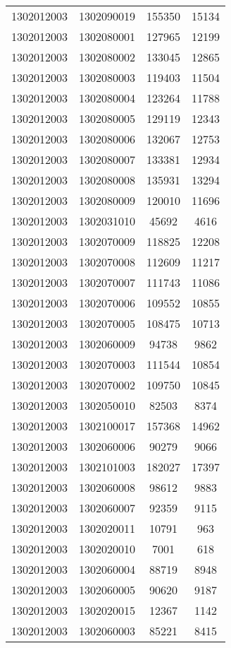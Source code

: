 \begin{longtable}[h]{llcc}
		1302012003 & 1302090019 & 155350 & 15134\\
		1302012003 & 1302080001 & 127965 & 12199\\
		1302012003 & 1302080002 & 133045 & 12865\\
		1302012003 & 1302080003 & 119403 & 11504\\
		1302012003 & 1302080004 & 123264 & 11788\\
		1302012003 & 1302080005 & 129119 & 12343\\
		1302012003 & 1302080006 & 132067 & 12753\\
		1302012003 & 1302080007 & 133381 & 12934\\
		1302012003 & 1302080008 & 135931 & 13294\\
		1302012003 & 1302080009 & 120010 & 11696\\
		1302012003 & 1302031010 & 45692 & 4616\\
		1302012003 & 1302070009 & 118825 & 12208\\
		1302012003 & 1302070008 & 112609 & 11217\\
		1302012003 & 1302070007 & 111743 & 11086\\
		1302012003 & 1302070006 & 109552 & 10855\\
		1302012003 & 1302070005 & 108475 & 10713\\
		1302012003 & 1302060009 & 94738 & 9862\\
		1302012003 & 1302070003 & 111544 & 10854\\
		1302012003 & 1302070002 & 109750 & 10845\\
		1302012003 & 1302050010 & 82503 & 8374\\
		1302012003 & 1302100017 & 157368 & 14962\\
		1302012003 & 1302060006 & 90279 & 9066\\
		1302012003 & 1302101003 & 182027 & 17397\\
		1302012003 & 1302060008 & 98612 & 9883\\
		1302012003 & 1302060007 & 92359 & 9115\\
		1302012003 & 1302020011 & 10791 & 963\\
		1302012003 & 1302020010 & 7001 & 618\\
		1302012003 & 1302060004 & 88719 & 8948\\
		1302012003 & 1302060005 & 90620 & 9187\\
		1302012003 & 1302020015 & 12367 & 1142\\
		1302012003 & 1302060003 & 85221 & 8415\\

\end{longtable}

